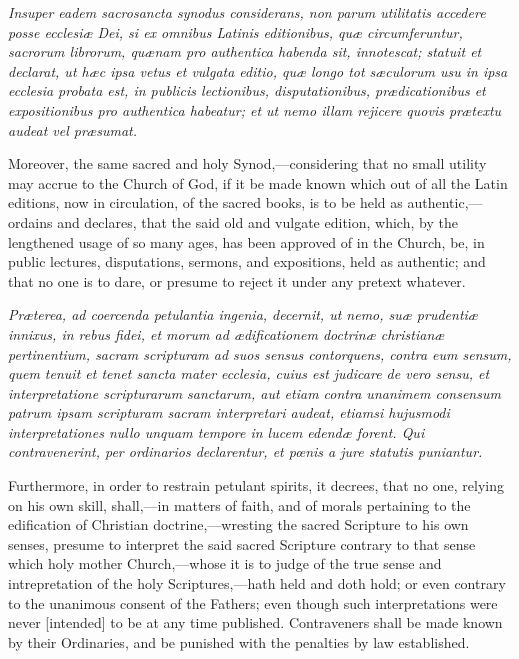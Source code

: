 \emph{Insuper eadem sacrosancta synodus considerans, non parum utilitatis accedere posse ecclesiæ Dei, si ex omnibus Latinis editionibus, quæ circumferuntur, sacrorum librorum, quænam pro authentica habenda sit, innotescat; statuit et declarat, ut hæc ipsa vetus et vulgata editio, quæ longo tot sæculorum usu in ipsa ecclesia probata est, in publicis lectionibus, disputationibus, prædicationibus et expositionibus pro authentica habeatur; et ut nemo illam rejicere quovis prætextu audeat vel præsumat.}

Moreover, the same sacred and holy Synod,—considering that no small utility may accrue to the Church of God, if it be made known which out of all the Latin editions, now in circulation, of the sacred books, is to be held as authentic,—ordains and declares, that the said old and vulgate edition, which, by the lengthened usage of so many ages, has been approved of in the Church, be, in public lectures, disputations, sermons, and expositions, held as authentic; and that no one is to dare, or presume to reject it under any pretext whatever.

\emph{Præterea, ad coercenda petulantia ingenia, decernit, ut nemo, suæ prudentiæ innixus, in rebus fidei, et morum ad ædificationem doctrinæ christianæ pertinentium, sacram scripturam ad suos sensus contorquens, contra eum sensum, quem tenuit et tenet sancta mater ecclesia, cuius est judicare de vero sensu, et interpretatione scripturarum sanctarum, aut etiam contra unanimem consensum patrum ipsam scripturam sacram interpretari audeat, etiamsi hujusmodi interpretationes nullo unquam tempore in lucem edendæ forent. Qui contravenerint, per ordinarios declarentur, et pœnis a jure statutis puniantur.}

Furthermore, in order to restrain petulant spirits, it decrees, that no one, relying on his own skill, shall,—in matters of faith, and of morals pertaining to the edification of Christian doctrine,—wresting the sacred Scripture to his own senses, presume to interpret the said sacred Scripture contrary to that sense which holy mother Church,—whose it is to judge of the true sense and intrepretation of the holy Scriptures,—hath held and doth hold; or even contrary to the unanimous consent of the Fathers; even though such interpretations were never [intended] to be at any time published. Contraveners shall be made known by their Ordinaries, and be punished with the penalties by law established.


